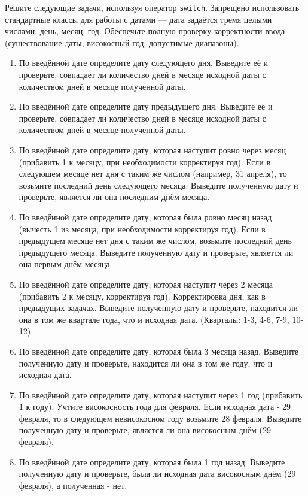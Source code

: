 \documentclass[12pt]{article}
\begin{document}
Решите следующие задачи, используя оператор \texttt{switch}. Запрещено использовать стандартные классы для работы с датами — дата задаётся тремя целыми числами: день, месяц, год. Обеспечьте полную проверку корректности ввода (существование даты, високосный год, допустимые диапазоны).

\begin{enumerate}
    \item По введённой дате определите дату следующего дня. Выведите её и проверьте, совпадает ли количество дней в месяце исходной даты с количеством дней в месяце полученной даты.
    \item По введённой дате определите дату предыдущего дня. Выведите её и проверьте, совпадает ли количество дней в месяце исходной даты с количеством дней в месяце полученной даты.
    \item По введённой дате определите дату, которая наступит ровно через месяц (прибавить 1 к месяцу, при необходимости корректируя год). Если в следующем месяце нет дня с таким же числом (например, 31 апреля), то возьмите последний день следующего месяца. Выведите полученную дату и проверьте, является ли она последним днём месяца.
    \item По введённой дате определите дату, которая была ровно месяц назад (вычесть 1 из месяца, при необходимости корректируя год). Если в предыдущем месяце нет дня с таким же числом, возьмите последний день предыдущего месяца. Выведите полученную дату и проверьте, является ли она первым днём месяца.
    \item По введённой дате определите дату, которая наступит через 2 месяца (прибавить 2 к месяцу, корректируя год). Корректировка дня, как в предыдущих задачах. Выведите полученную дату и проверьте, находится ли она в том же квартале года, что и исходная дата. (Кварталы: 1-3, 4-6, 7-9, 10-12)
    \item По введённой дате определите дату, которая была 3 месяца назад. Выведите полученную дату и проверьте, находится ли она в том же году, что и исходная дата.
    \item По введённой дате определите дату, которая наступит через 1 год (прибавить 1 к году). Учтите високосность года для февраля. Если исходная дата - 29 февраля, то в следующем невисокосном году возьмите 28 февраля. Выведите полученную дату и проверьте, является ли она високосным днём (29 февраля).
    \item По введённой дате определите дату, которая была 1 год назад. Выведите полученную дату и проверьте, была ли исходная дата високосным днём (29 февраля), а полученная - нет.

\end{enumerate}
\end{document}
